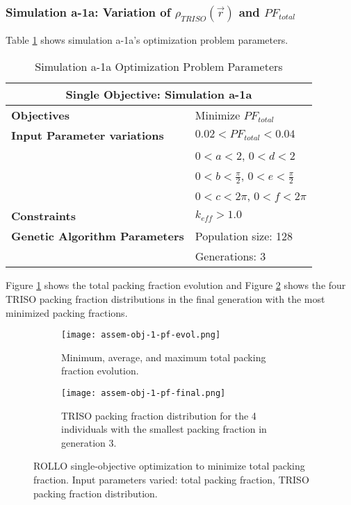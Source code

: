 \subsubsection{Simulation a-1a: Variation of $\rho_{TRISO}(\vec{r})$ and $PF_{total}$}
Table \ref{tab:simulationa1a} shows simulation a-1a's optimization problem parameters. 
\begin{table}[htbp]
    \centering
    \onehalfspacing
    \caption{Simulation a-1a Optimization Problem Parameters}
	\label{tab:simulationa1a}
    \footnotesize
    \begin{tabular}{l|p{3cm}}
    \hline 
    \multicolumn{2}{c}{\textbf{Single Objective: Simulation a-1a}} \\
    \hline 
    \textbf{Objectives} & Minimize $PF_{total}$ \\
    \hline 
    \textbf{Input Parameter variations} & $0.02<PF_{total}<0.04$ \\
    & $0<a<2$, $0<d<2$\\
    & $0<b<\frac{\pi}{2}$, $0<e<\frac{\pi}{2}$\\
    & $0<c<2\pi$, $0<f<2\pi$\\
    \hline
    \textbf{Constraints} & $k_{eff} > 1.0$\\ 
    \hline 
    \textbf{Genetic Algorithm Parameters} & Population size: 128 \\
    & Generations: 3 \\
    \hline
    \end{tabular}
\end{table}
Figure \ref{fig:assem-obj-1-pf-evol} shows the total packing fraction evolution and 
Figure \ref{fig:assem-obj-1-pf-final} shows the four TRISO packing fraction distributions in 
the final generation with the most minimized packing fractions. 
\begin{figure}[htbp]
    \centering
    \begin{subfigure}{\textwidth}
        \texttt{[image: assem-obj-1-pf-evol.png]}
        \caption{Minimum, average, and maximum total packing fraction evolution.}
        \label{fig:assem-obj-1-pf-evol} 
    \end{subfigure}
    \begin{subfigure}{\textwidth}
        \texttt{[image: assem-obj-1-pf-final.png]}
        \caption{TRISO packing fraction distribution for the 4 individuals with the 
        smallest packing fraction in generation 3.}
        \label{fig:assem-obj-1-pf-final} 
    \end{subfigure}
    \caption{ROLLO single-objective optimization to minimize total packing fraction. 
    Input parameters varied: total packing fraction, TRISO packing fraction distribution.}
    \label{fig:assem-obj-1-pf}
\end{figure}
